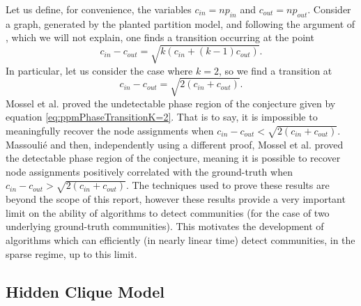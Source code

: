 Let us define, for convenience, the variables $c_{in} = np_{in}$ and $c_{out} = np_{out}$.
Consider a graph, generated by the planted partition model, and following the argument of \cite{NN12}, which we will not explain, one finds a transition occurring at the point
\begin{equation}
\label{eq:ppmPhaseTransitionK}
	c_{in} - c_{out} = \sqrt{k(c_{in} + (k-1)c_{out})}.
\end{equation}
In particular, let us consider the case where $k = 2$, so we find a transition at
\begin{equation}
\label{eq:ppmPhaseTransitionK=2}
	c_{in} - c_{out} = \sqrt{2(c_{in} + c_{out})}.
\end{equation}
Mossel et al. \cite{MNS12} proved the undetectable phase region of the conjecture given by equation \cref{eq:ppmPhaseTransitionK=2}.
That is to say, it is impossible to meaningfully recover the node assignments when $ c_{in} - c_{out} < \sqrt{2(c_{in} + c_{out})}$.
Massouli\'e \cite{Mas13} and then, independently using a different proof, Mossel et al. \cite{MNS13b} proved the detectable phase region of the conjecture, meaning it is possible to recover node assignments positively correlated with the ground-truth when $ c_{in} - c_{out} > \sqrt{2(c_{in} + c_{out})}$.
The techniques used to prove these results are beyond the scope of this report, however these results provide a very important limit on the ability of algorithms to detect communities (for the case of two underlying ground-truth communities).
This motivates the development of algorithms which can efficiently (in nearly linear time) detect communities, in the sparse regime, up to this limit.


\subsection{Hidden Clique Model}
\label{subsec:hiddenCliqueModel}

